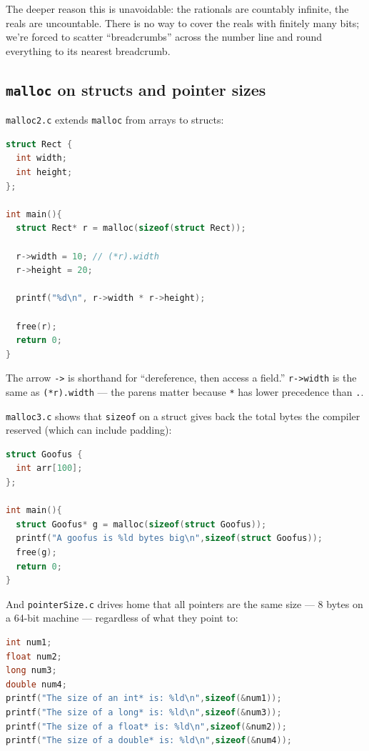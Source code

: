 \documentclass[11pt]{article}
\begin{document}
The deeper reason this is unavoidable: the rationals are countably
infinite, the reals are uncountable. There is no way to cover the
reals with finitely many bits; we're forced to scatter
``breadcrumbs'' across the number line and round everything to its
nearest breadcrumb.

\subsection*{\texttt{malloc} on structs and pointer sizes}

\texttt{malloc2.c} extends \texttt{malloc} from arrays to structs:

\begin{lstlisting}[language=C]
struct Rect {
  int width;
  int height;
};

int main(){
  struct Rect* r = malloc(sizeof(struct Rect));

  r->width = 10; // (*r).width
  r->height = 20;

  printf("%d\n", r->width * r->height);

  free(r);
  return 0;
}
\end{lstlisting}

The arrow \texttt{->} is shorthand for ``dereference, then access a
field.'' \texttt{r->width} is the same as \texttt{(*r).width} ---
the parens matter because \texttt{*} has lower precedence than
\texttt{.}.

\texttt{malloc3.c} shows that \texttt{sizeof} on a struct gives
back the total bytes the compiler reserved (which can include
padding):

\begin{lstlisting}[language=C]
struct Goofus {
  int arr[100];
};

int main(){
  struct Goofus* g = malloc(sizeof(struct Goofus));
  printf("A goofus is %ld bytes big\n",sizeof(struct Goofus));
  free(g);
  return 0;
}
\end{lstlisting}

And \texttt{pointerSize.c} drives home that all pointers are the
same size --- 8 bytes on a 64-bit machine --- regardless of what
they point to:

\begin{lstlisting}[language=C]
int num1;
float num2;
long num3;
double num4;
printf("The size of an int* is: %ld\n",sizeof(&num1));
printf("The size of a long* is: %ld\n",sizeof(&num3));
printf("The size of a float* is: %ld\n",sizeof(&num2));
printf("The size of a double* is: %ld\n",sizeof(&num4));
\end{lstlisting}
\end{document}
